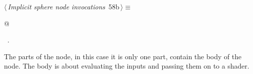 \documentclass[
    a4paper,      %
    10pt,         %
    openright,    %
    notitlepage,  %
    parskip=half, %
]{scrreprt}       %
\theoremstyle{definition}                    %
\begin{document}
\begin{flushleft} \small
\begin{minipage}{\linewidth}\label{scrap94}\raggedright\small
{} $\langle\,${\itshape Implicit sphere node invocations}\nobreak\ {\footnotesize {58b}}$\,\rangle\equiv$
\vspace{-1exm}
\begin{list}{}{} \item
\mbox{}@{\NWsep}
\end{list}
\vspace{-1.5ex}
\footnotesize
\begin{list}{}{\setlength{\itemsep}{-\parsep}\setlength{\itemindent}{-\leftmargin}}
\item \NWtxtMacroRefIn\ .

\item{}
\end{list}
\end{minipage}\vspace{4ex}
\end{flushleft}
The parts of the node, in this case it is only one part, contain the body of
the node. The body is about evaluating the inputs and passing them on to a
shader.
\end{document}
